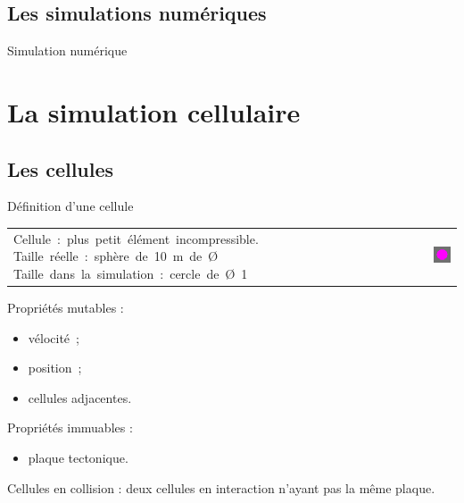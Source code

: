\documentclass{beamer}
\begin{document}
\subsection{Les simulations numériques}
\begin{frame}{Simulation numérique}
  \begin{center}
    \begin{figure}
    \end{figure}
  \end{center}
\end{frame}

\section{La simulation cellulaire}

\subsection{Les cellules}
\begin{frame}{Définition d'une cellule}
  \begin{tabular}{m{8cm}m{1cm}m{2cm}}
    \mbox{Cellule : plus petit élément incompressible.}
    \mbox{Taille réelle : sphère de 10 m de Ø}
    \mbox{Taille dans la simulation : cercle de Ø 1} &&
    \includegraphics[width=1.5cm]{Images/cellule.png}
  \end{tabular}
  Propriétés mutables :
  \begin{itemize}
   \item vélocité~;
   \item position~;
   \item cellules adjacentes.
  \end{itemize}
  Propriétés immuables :
  \begin{itemize}
   \item plaque tectonique.\\
  \end{itemize}
  \smallbreak
  Cellules en collision : deux cellules en interaction n'ayant pas la même plaque.
\end{frame}
\end{document}
